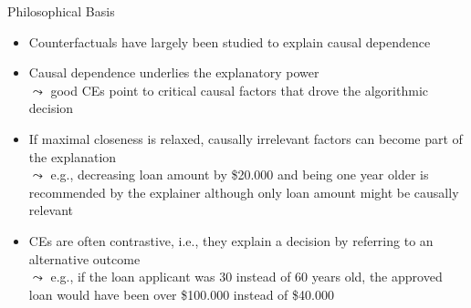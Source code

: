 \documentclass[11pt,compress,t,notes=noshow, aspectratio=169, xcolor=table, usenames,dvipsnames]{beamer}
\begin{document}
\begin{frame}{Philosophical Basis}
	\begin{itemize}[<+->]
	\item Counterfactuals have largely been studied to explain causal dependence
		\item Causal dependence underlies the explanatory power\\
		$\leadsto$ good CEs point to critical causal factors that drove the algorithmic decision
		\item If maximal closeness is relaxed, causally irrelevant factors can become part of the explanation\\
		$\leadsto$ e.g., decreasing loan amount by \$20.000 and being one year older is recommended by the explainer although only loan amount might be causally relevant
		\item CEs are often contrastive, i.e., they explain a decision by referring to an alternative outcome\\
		$\leadsto$ e.g., if the loan applicant was 30 instead of 60 years old, the approved loan would have been over \$100.000 instead of \$40.000%
	\end{itemize}
\end{frame}

\end{document}
